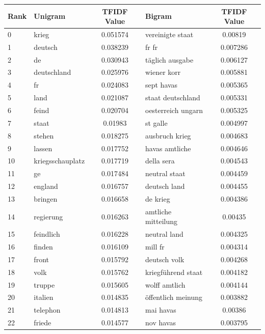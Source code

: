 \documentclass[11pt]{article}
\begin{document}
\begin{table}[H]
\begin{small}
\begin{center}
\label{propaganda_table_gsw}
\begin{tabular*}{\textwidth}{|l|| @{\extracolsep{\fill}} l c || l c |} 
\hline
Rank & Unigram & TFIDF Value  & Bigram & TFIDF Value \\
\hline
\hline
0 & krieg & 0.051574 & vereinigte staat & 0.00819 \\
1 & deutsch & 0.038239 & fr fr & 0.007286 \\
2 & de & 0.030943 & täglich ausgabe & 0.006127 \\
3 & deutschland & 0.025976 & wiener korr & 0.005881 \\
4 & fr & 0.024083 & sept havas & 0.005365 \\
5 & land & 0.021087 & staat deutschland & 0.005331 \\
6 & feind & 0.020704 & oesterreich ungarn & 0.005325 \\
7 & staat & 0.01983 & st galle & 0.004997 \\
8 & stehen & 0.018275 & ausbruch krieg & 0.004683 \\
9 & lassen & 0.017752 & havas amtliche & 0.004646 \\
10 & kriegsschauplatz & 0.017719 & della sera & 0.004543 \\
11 & ge & 0.017484 & neutral staat & 0.004459 \\
12 & england & 0.016757 & deutsch land & 0.004455 \\
13 & bringen & 0.016658 & de krieg & 0.004386 \\
14 & regierung & 0.016263 & amtliche mitteilung & 0.00435 \\
15 & feindlich & 0.016228 & neutral land & 0.004325 \\
16 & finden & 0.016109 & mill fr & 0.004314 \\
17 & front & 0.015792 & deutsch volk & 0.004268 \\
18 & volk & 0.015762 & kriegführend staat & 0.004182 \\
19 & truppe & 0.015605 & wolff amtlich & 0.004144 \\
20 & italien & 0.014835 & öffentlich meinung & 0.003882 \\
21 & telephon & 0.014813 & mai havas & 0.00386 \\
22 & friede & 0.014577 & nov havas & 0.003795 \\

\end{tabular*}
\end{center}
\end{small}
\end{table}
\end{document}
